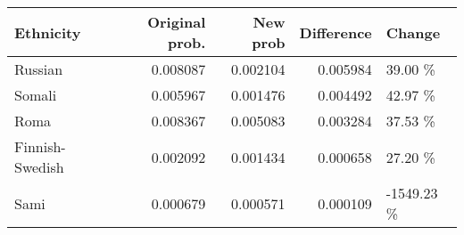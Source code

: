 \begin{tabular}{lrrrl}
\toprule
      Ethnicity &  Original prob. &  New prob &  Difference &     Change \\
\midrule
        Russian &        0.008087 &  0.002104 &    0.005984 &    39.00 \% \\
         Somali &        0.005967 &  0.001476 &    0.004492 &    42.97 \% \\
           Roma &        0.008367 &  0.005083 &    0.003284 &    37.53 \% \\
Finnish-Swedish &        0.002092 &  0.001434 &    0.000658 &    27.20 \% \\
           Sami &        0.000679 &  0.000571 &    0.000109 & -1549.23 \% \\
\bottomrule
\end{tabular}
